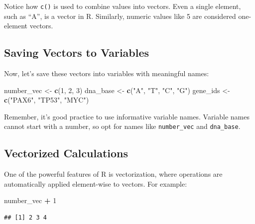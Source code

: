 \documentclass[
]{book}
\newenvironment{Shaded}{\begin{snugshade}}{\end{snugshade}}
\newcommand{\DecValTok}[1]{\textcolor[rgb]{0.00,0.00,0.81}{#1}}
\newcommand{\FunctionTok}[1]{\textcolor[rgb]{0.13,0.29,0.53}{\textbf{#1}}}
\newcommand{\NormalTok}[1]{#1}
\newcommand{\OtherTok}[1]{\textcolor[rgb]{0.56,0.35,0.01}{#1}}
\newcommand{\SpecialCharTok}[1]{\textcolor[rgb]{0.81,0.36,0.00}{\textbf{#1}}}
\newcommand{\StringTok}[1]{\textcolor[rgb]{0.31,0.60,0.02}{#1}}
\begin{document}
Notice how \texttt{c()} is used to combine values into vectors. Even a single element, such as ``A'', is a vector in R. Similarly, numeric values like 5 are considered one-element vectors.

\hypertarget{saving-vectors-to-variables}{%
\subsection{Saving Vectors to Variables}\label{saving-vectors-to-variables}}

Now, let's save these vectors into variables with meaningful names:

\begin{Shaded}
\begin{Highlighting}[]
\NormalTok{number\_vec }\OtherTok{\textless{}{-}} \FunctionTok{c}\NormalTok{(}\DecValTok{1}\NormalTok{, }\DecValTok{2}\NormalTok{, }\DecValTok{3}\NormalTok{)}
\NormalTok{dna\_base }\OtherTok{\textless{}{-}} \FunctionTok{c}\NormalTok{(}\StringTok{"A"}\NormalTok{, }\StringTok{"T"}\NormalTok{, }\StringTok{"C"}\NormalTok{, }\StringTok{"G"}\NormalTok{) }
\NormalTok{gene\_ids }\OtherTok{\textless{}{-}} \FunctionTok{c}\NormalTok{(}\StringTok{"PAX6"}\NormalTok{, }\StringTok{"TP53"}\NormalTok{, }\StringTok{"MYC"}\NormalTok{)}
\end{Highlighting}
\end{Shaded}

Remember, it's good practice to use informative variable names. Variable names cannot start with a number, so opt for names like \texttt{number\_vec} and \texttt{dna\_base}.

\hypertarget{vectorized-calculations}{%
\subsection{Vectorized Calculations}\label{vectorized-calculations}}

One of the powerful features of R is vectorization, where operations are automatically applied element-wise to vectors. For example:

\begin{Shaded}
\begin{Highlighting}[]
\NormalTok{number\_vec }\SpecialCharTok{+} \DecValTok{1} 
\end{Highlighting}
\end{Shaded}

\begin{verbatim}
## [1] 2 3 4
\end{verbatim}
\end{document}
